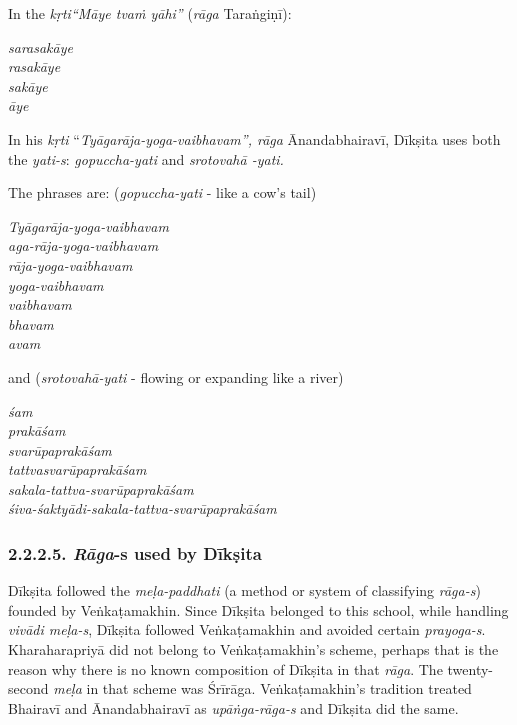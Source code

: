 In the \textit{kṛti“Māye tvaṁ yāhi”} (\textit{rāga} Taraṅgiṇī):

\begin{myquote}
\textit{sarasakāye}\\\textit{rasakāye}\\\textit{sakāye}\\\textit{āye}
\end{myquote}

In his \textit{kṛti} “\textit{Tyāgarāja-yoga-vaibhavam”, rāga} Ānandabhairavī, Dīkṣita uses both the \textit{yati-s}: \textit{gopuccha-yati} and \textit{srotovahā -yati.}

The phrases are: (\textit{gopuccha-yati} - like a cow’s tail)

\begin{myquote}
\textit{Tyāgarāja-yoga-vaibhavam}\\\textit{aga-rāja-yoga-vaibhavam}\\\textit{rāja-yoga-vaibhavam}\\\textit{yoga-vaibhavam}\\\textit{vaibhavam}\\\textit{bhavam}\\\textit{avam}
\end{myquote}

and (\textit{srotovahā-yati} - flowing or expanding like a river)

\begin{myquote}
\textit{śam}\\\textit{prakāśam}\\\textit{svarūpaprakāśam}\\\textit{tattvasvarūpaprakāśam}\\\textit{sakala-tattva-svarūpaprakāśam}\\\textit{śiva-śaktyādi-sakala-tattva-svarūpaprakāśam}
\end{myquote}

\vspace{-.4cm}

\subsubsection*{2.2.2.5. \textit{Rāga}-s used by Dīkṣita}

Dīkṣita followed the \textit{meḷa-paddhati} (a method or system of classifying \textit{rāga-s}) founded by Veṅkaṭamakhin. Since Dīkṣita belonged to this school, while handling \textit{vivādi meḷa-s}, Dīkṣita followed Veṅkaṭamakhin and avoided certain \textit{prayoga-s}. Kharaharapriyā did not belong to Veṅkaṭamakhin’s scheme, perhaps that is the reason why there is no known composition of Dīkṣita in that \textit{rāga}. The twenty-second \textit{meḷa} in that scheme was Śrīrāga. Veṅkaṭamakhin’s tradition treated Bhairavī and Ānandabhairavī as \textit{upāṅga-rāga-s} and Dīkṣita did the same.

